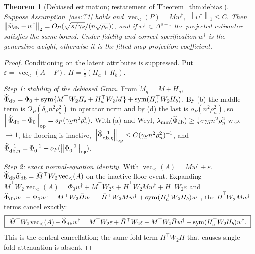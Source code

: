 \documentclass[12pt]{article}
\newtheorem{theorem}{Theorem}
\newcommand{\1}{\mathbf{1}}
\newcommand{\norm}[1]{\left\lVert#1\right\rVert}
\providecommand{\op}{\operatorname{op}}
\providecommand{\sym}{\operatorname{sym}}
\begin{document}
\begin{theorem}[Debiased estimation; restatement of Theorem~\ref{thm:debias}]
\label{thm:debias-cor}
Suppose Assumption~\ref{ass:T1} holds and $\operatorname{vec}_<(P)=Mw^\dagger$, $\norm{w^\dagger}_1\le
C$. Then $\norm{\widetilde w_{\rm db}-w^\dagger}_2=O_P(\sqrt{s/\gamma_S}/(n\sqrt{\rho_n}))$, and if
$w^\dagger\in\Delta^{s-1}$ the projected estimator satisfies the same bound. Under fidelity and
correct specification $w^\dagger$ is the generative weight; otherwise it is the fitted-map
projection coefficient.
\end{theorem}

\begin{proof}
Conditioning on the latent attributes is suppressed. Put $\varepsilon=\operatorname{vec}_<(A-P)$,
$\bar H=\tfrac12(H_a+H_b)$.

\emph{Step 1: stability of the debiased Gram.} From $\widehat M_g=M+H_g$,
$\widehat\Phi_{\rm db}=\Phi_0+\sym\{M^\top W_2H_b+H_a^\top W_2M\}+\sym(H_a^\top W_2H_b)$. By (b)
the middle term is $O_P(\delta_n n^2\rho_n^2)$ in operator norm and by (d) the last is
$o_P(n^2\rho_n^2)$, so $\norm{\widehat\Phi_{\rm db}-\Phi_0}_{\op}=o_P(\gamma_S n^2\rho_n^2)$. With
(a) and Weyl, $\lambda_{\min}(\widehat\Phi_{\rm db})\ge\tfrac12c\gamma_S n^2\rho_n^2$ w.p.\ $\to1$,
the flooring is inactive, $\norm{\widehat\Phi_{{\rm db},\eta}^{-1}}_{\op}\le C(\gamma_S
n^2\rho_n^2)^{-1}$, and $\widehat\Phi_{{\rm db},\eta}^{-1}=\Phi_0^{-1}+o_P(\norm{\Phi_0^{-1}}_{\op})$.

\emph{Step 2: exact normal-equation identity.} With $\operatorname{vec}_<(A)=Mw^\dagger+\varepsilon$,
$\widehat\Phi_{\rm db}\widetilde w_{\rm db}=\bar M^\top W_2\operatorname{vec}_<(A)$ on the inactive-floor
event. Expanding $\bar M^\top W_2\operatorname{vec}_<(A)=\Phi_0w^\dagger+M^\top W_2\varepsilon+\bar
H^\top W_2Mw^\dagger+\bar H^\top W_2\varepsilon$ and $\widehat\Phi_{\rm db}w^\dagger=\Phi_0w^\dagger+M^\top
W_2\bar Hw^\dagger+\bar H^\top W_2Mw^\dagger+\sym(H_a^\top W_2H_b)w^\dagger$, the $\bar H^\top
W_2Mw^\dagger$ terms cancel exactly:
\[
\boxed{\ \bar M^\top W_2\operatorname{vec}_<(A)-\widehat\Phi_{\rm db}w^\dagger=M^\top W_2\varepsilon+\bar
H^\top W_2\varepsilon-M^\top W_2\bar Hw^\dagger-\sym(H_a^\top W_2H_b)w^\dagger.\ }
\]
This is the central cancellation; the same-fold term $H^\top W_2H$ that causes single-fold
attenuation is absent.


\end{proof}
\end{document}
